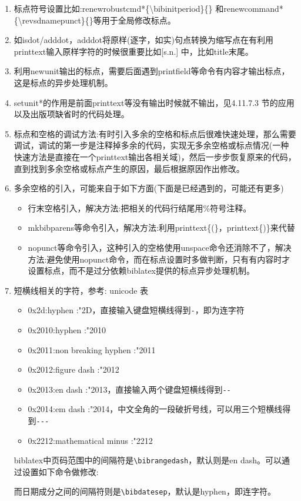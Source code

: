   \begin{enumerate}
    \item 标点符号设置比如:renewrobustcmd*\{\textbackslash bibinitperiod\}\{\} 和renewcommand*\{\textbackslash revsdnamepunct\}\{\}等用于全局修改标点。
    \item 如isdot/adddot，adddot将原样(逐字，如实)句点转换为缩写点在有利用printtext输入原样字符的时候很重要比如[s.n.] 中，比如title末尾。
    \item 利用newunit输出的标点，需要后面遇到printfield等命令有内容才输出标点，这是标点的异步处理机制。
    \item setunit*的作用是前面printtext等没有输出时候就不输出，见4.11.7.3 节的应用以及出版项缺省时的代码处理。
    \item 标点和空格的调试方法:有时引入多余的空格和标点后很难快速处理，那么需要调试，调试的第一步是注释掉多余的代码，实现无多余空格或标点情况(一种快速方法是直接在一个printtext输出各相关域)，然后一步步恢复原来的代码，直到找到多余空格或标点产生的原因，最后根据原因作出修改。
    \item 多余空格的引入，可能来自于如下方面(下面是已经遇到的，可能还有更多)
    \begin{itemize}
    \item 行末空格引入，解决方法:把相关的代码行结尾用\%符号注释。
    \item mkbibparens等命令引入，解决方法:利用printtext\{(\}，printtext\{)\}来代替
    \item nopunct等命令引入，这种引入的空格使用unspace命令还消除不了，解决方法:避免使用nopunct命令，而在标点设置时多做判断，只有有内容时才设置标点，而不是过分依赖biblatex提供的标点异步处理机制。
    \end{itemize}

    \item 短横线相关的字符，参考: unicode 表

        \begin{itemize}
        \item 0x2d:hyphen :\char"2D，直接输入键盘短横线得到\verb|-|，即为连字符
        \item 0x2010:hyphen :\char"2010
        \item 0x2011:non breaking hyphen :\char"2011
        \item 0x2012:figure dash :\char"2012
        \item 0x2013:en dash :\char"2013，直接输入两个键盘短横线得到\verb|--|
        \item 0x2014:em dash :\char"2014，中文全角的一段破折号线，可以用三个短横线得到\verb|---|
        \item 0x2212:mathematical minus :\char"2212
        \end{itemize}
        biblatex中页码范围中的间隔符是\verb|\bibrangedash|，默认则是en dash。可以通过设置如下命令做修改:
        \begin{texlist}
        \end{texlist}
        而日期成分之间的间隔符则是\verb|\bibdatesep|，默认是hyphen，即连字符。


\end{enumerate}
